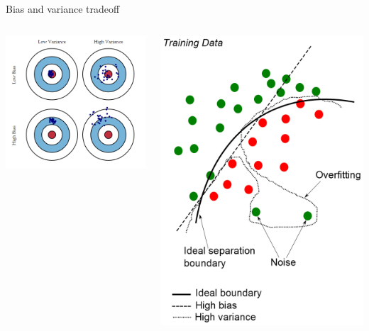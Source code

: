 \documentclass[10pt]{beamer}
\begin{document}
\begin{frame}{Bias and variance tradeoff}
\begin{columns}[C]
    \centering
    \begin{column}{.45\textwidth}
        \includegraphics[scale=0.35]{images/biasandvariance.png}
    \end{column}
    \begin{column}{.45\textwidth}
        \includegraphics[scale=0.2]{images/bias_variance.png}

\end{column}
\end{columns}
\end{frame}
\end{document}
